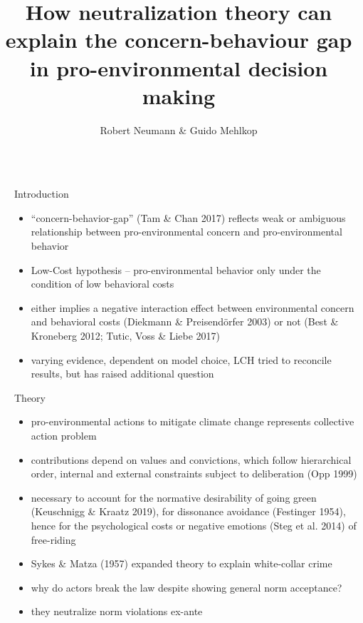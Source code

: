 \documentclass[final]{beamer}
\title{How neutralization theory can explain the concern-behaviour gap in pro-environmental decision making}
\author{Robert Neumann \inst{1} \& Guido Mehlkop \inst{2}}
\institute[shortinst]{\inst{1} Technische Universität Dresden \samelineand \inst{2} University of Erfurt}
\newlength{\sepwidth}
\newlength{\colwidth}
\newcommand{\separatorcolumn}{\begin{column}{\sepwidth}\end{column}}
\begin{document}
\begin{frame}[t]
\begin{columns}[t]
\separatorcolumn

\begin{column}{\colwidth}

\begin{block}{Introduction}

\begin{itemize}
\item \enquote{concern-behavior-gap} (Tam \& Chan 2017) reflects weak or ambiguous relationship between pro-environmental concern and pro-environmental behavior
\item Low-Cost hypothesis -- pro-environmental behavior only under the condition of low behavioral costs
\item either implies a negative interaction effect between environmental concern and behavioral costs (Diekmann \& Preisendörfer 2003) or not (Best \& Kroneberg 2012; Tutic, Voss \& Liebe 2017)
\item varying evidence, dependent on model choice, LCH tried to reconcile results, but has raised additional question 
\end{itemize}

  \end{block}

   \begin{alertblock}{Theory}



\begin{itemize}
\item pro-environmental actions to mitigate climate change represents collective action problem
\item contributions depend on values and convictions, which follow hierarchical order, internal and external constraints subject to deliberation (Opp 1999)
\item necessary to account for the normative desirability of going green (Keuschnigg \& Kraatz 2019), for dissonance avoidance (Festinger 1954), hence for the psychological costs or negative emotions (Steg et al. 2014) of free-riding
\end{itemize}

 \begin{itemize}
\item Sykes \& Matza (1957) expanded theory to explain white-collar crime 
\item why do actors break the law despite showing general norm acceptance?
\item they neutralize norm violations ex-ante 
\end{itemize}


\end{alertblock}
\end{column}
\end{columns}
\end{frame}
\end{document}
